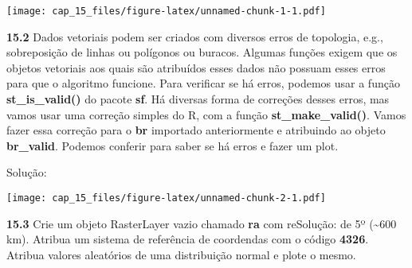 \documentclass[
]{book}
\newenvironment{Shaded}{\begin{snugshade}}{\end{snugshade}}
\newcommand{\AttributeTok}[1]{\textcolor[rgb]{0.77,0.63,0.00}{#1}}
\newcommand{\CommentTok}[1]{\textcolor[rgb]{0.56,0.35,0.01}{\textit{#1}}}
\newcommand{\ConstantTok}[1]{\textcolor[rgb]{0.00,0.00,0.00}{#1}}
\newcommand{\FunctionTok}[1]{\textcolor[rgb]{0.00,0.00,0.00}{#1}}
\newcommand{\NormalTok}[1]{#1}
\newcommand{\OtherTok}[1]{\textcolor[rgb]{0.56,0.35,0.01}{#1}}
\newcommand{\SpecialCharTok}[1]{\textcolor[rgb]{0.00,0.00,0.00}{#1}}
\newcommand{\StringTok}[1]{\textcolor[rgb]{0.31,0.60,0.02}{#1}}
\begin{document}
\texttt{[image: cap\_15\_files/figure-latex/unnamed-chunk-1-1.pdf]}

\textbf{15.2}
Dados vetoriais podem ser criados com diversos erros de topologia, e.g., sobreposição de linhas ou polígonos ou buracos. Algumas funções exigem que os objetos vetoriais aos quais são atribuídos esses dados não possuam esses erros para que o algoritmo funcione. Para verificar se há erros, podemos usar a função \textbf{st\_is\_valid()} do pacote \textbf{sf}. Há diversas forma de correções desses erros, mas vamos usar uma correção simples do R, com a função \textbf{st\_make\_valid()}. Vamos fazer essa correção para o \textbf{br} importado anteriormente e atribuindo ao objeto \textbf{br\_valid}. Podemos conferir para saber se há erros e fazer um plot.

Solução:

\begin{Shaded}
\end{Shaded}

\texttt{[image: cap\_15\_files/figure-latex/unnamed-chunk-2-1.pdf]}

\textbf{15.3}
Crie um objeto RasterLayer vazio chamado \textbf{ra} com reSolução: de 5º (\textasciitilde600 km). Atribua um sistema de referência de coordendas com o código \textbf{4326}. Atribua valores aleatórios de uma distribuição normal e plote o mesmo.
\end{document}
